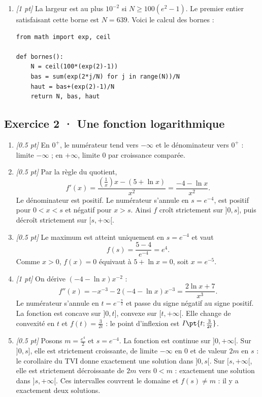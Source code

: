 \begin{enumerate}

\item \textit{[1 pt]} La largeur est au plus $10^{-2}$ si $N\ge100(e^{2}-1)$. Le premier entier satisfaisant cette borne est $N=639$. Voici le calcul des bornes :
\begin{lstlisting}
from math import exp, ceil

def bornes():
    N = ceil(100*(exp(2)-1))
    bas = sum(exp(2*j/N) for j in range(N))/N
    haut = bas+(exp(2)-1)/N
    return N, bas, haut
\end{lstlisting}


\end{enumerate}

\subsection*{Exercice 2 · Une fonction logarithmique}\begin{enumerate}

\item \textit{[\num{0,5} pt]} En $0^+$, le numérateur tend vers $-\infty$ et le dénominateur vers $0^+$ : limite $-\infty$ ; en $+\infty$, limite $0$ par croissance comparée.

\item \textit{[\num{0,5} pt]} Par la règle du quotient,
\[f'(x)=\frac{(\frac{1}{x})x-(5+\ln x)}{x^2}=\frac{-4-\ln x}{x^2}.\]
Le dénominateur est positif. Le numérateur s'annule en $s=e^{-4}$, est positif pour $0<x<s$ et négatif pour $x>s$. Ainsi $f$ croît strictement sur $]0,s]$, puis décroît strictement sur $[s,+\infty[$.

\item \textit{[\num{0,5} pt]} Le maximum est atteint uniquement en $s=e^{-4}$ et vaut
\[f(s)=\frac{5- 4}{e^{-4}}=e^{4}.\]
Comme $x>0$, $f(x)=0$ équivaut à $5+\ln x=0$, soit $x=e^{-5}$.

\item \textit{[1 pt]} On dérive $(-4-\ln x)x^{-2}$ :
\[f''(x)=-x^{-3}-2(-4-\ln x)x^{-3}=\frac{2\ln x+7}{x^3}.\]
Le numérateur s'annule en $t=e^{-\frac{7}{2}}$ et passe du signe négatif au signe positif. La fonction est concave sur $]0,t]$, convexe sur $[t,+\infty[$. Elle change de convexité en $t$ et $f(t)=\frac{3}{2t}$ : le point d'inflexion est $I\pt{t;\frac{3}{2t}}$.

\item \textit{[\num{0,5} pt]} Posons $m=\frac{e^{4}}{2}$ et $s=e^{-4}$. La fonction est continue sur $]0,+\infty[$. Sur $]0,s]$, elle est strictement croissante, de limite $-\infty$ en $0$ et de valeur $2m$ en $s$ : le corollaire du TVI donne exactement une solution dans $]0,s[$. Sur $[s,+\infty[$, elle est strictement décroissante de $2m$ vers $0<m$ : exactement une solution dans $]s,+\infty[$. Ces intervalles couvrent le domaine et $f(s)\ne m$ : il y a exactement deux solutions.


\end{enumerate}
